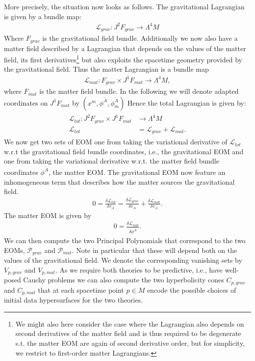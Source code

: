 \documentclass[a4paper,12pt, DIV=14, BCOR=5mm, twoside, headsepline, numbers=noenddot]{scrbook}
\begin{document}
More precisely, the situation now looks as follows.
The gravitational Lagrangian is given by a bundle map:
\begin{align}
    \mathcal{L}_{grav} : J^2F_{grav} \longrightarrow \Lambda^4M
\end{align}
Where $F_{grav}$ is the gravitational field bundle. Additionally we now also have a matter field described by a Lagrangian that depends on the values of the matter field, its first derivatives\footnote{We might also here consider the case where the Lagrangian also depends on second derivatives of the matter field and is thus required to be degenerate s.t. the matter EOM are again of second derivative order, but for simplicity, we restrict to first-order matter Lagrangians.} but also exploits the spacetime geometry provided by the gravitational field. Thus the matter Lagrangian is a bundle map
\begin{align}
    \mathcal{L}_{mat} : F_{grav} \times J^1F_{mat} \longrightarrow \Lambda^4M,
\end{align}
where $F_{mat}$ is the matter field bundle. In the following we will denote adapted coordinates on $J^1F_{mat}$ by $(x^m,\phi^{\tilde{A}},\phi^{\tilde{A}}_m)$ Hence the total Lagrangian is given by:
\begin{align}
\begin{aligned}
    \mathcal{L}_{tot} : J^2F_{grav} \times J^1F_{mat} &\longrightarrow \Lambda^4M \\
    \mathcal{L}_{tot} &= \mathcal{L}_{grav} + \mathcal{L}_{mat}.
\end{aligned}
\end{align}
We now get two sets of EOM one from taking the variational derivative of $\mathcal{L}_{tot}$ w.r.t the gravitational field bundle coordinates, i.e., the gravitational EOM and one from taking the variational derivative w.r.t. the matter field bundle coordinates $\phi^{\tilde{A}}$, the matter EOM.
The gravitational EOM now feature an inhomogeneous term that describes how the matter sources the gravitational field.
\begin{align}
    0 = \frac{\delta \mathcal{L}_{tot}}{\delta v_A} = \frac{\delta \mathcal{L}_{grav}}{\delta v_A} + \frac{\delta \mathcal{L}_{mat}}{\delta v_A}.
\end{align}
The matter EOM is given by 
\begin{align}
    0 = \frac{\delta \mathcal{L}_{mat}}{\delta \phi^{\tilde{A}}}.
\end{align}
We can then compute the two Principal Polynomials that correspond to the two EOMs, $\mathcal{P}_{grav}$ and $\mathcal{P}_{mat}$. Note in particular that these will depend both on the values of the gravitational field. We denote the corresponding vanishing sets by $V_{p,grav}$ and $V_{p,mat}$. As we require both theories to be predictive, i.e., have well-posed Cauchy problems we can also compute the two hyperbolicity cones $C_{p,grav}$ and $C_{p,mat}$ that at each spacetime point $p\in M$ encode the possible choices of initial data hypersurfaces for the two theories. 
\end{document}
